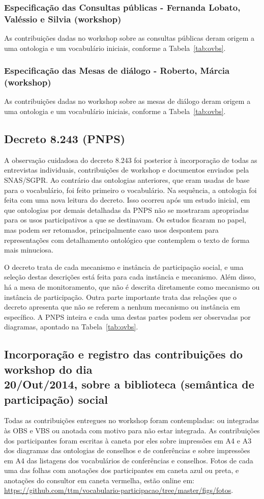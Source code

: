 \documentclass[12pt]{article}
\begin{document}
\subsubsection{Especificação das Consultas públicas - Fernanda Lobato, Valéssio e Silvia (workshop)}
As contribuições dadas no workshop sobre as consultas públicas deram origem a uma ontologia e um vocabulário iniciais, conforme a Tabela~\ref{tab:ovbs}.

\subsubsection{Especificação das Mesas de diálogo - Roberto, Márcia (workshop)}
As contribuições dadas no workshop sobre as mesas de diálogo deram origem a uma ontologia e um vocabulário iniciais, conforme a Tabela~\ref{tab:ovbs}.


\subsection{Decreto 8.243 (PNPS)}\label{ap:pnps}
A observação cuidadosa do decreto 8.243 foi posterior à incorporação de todas as entrevistas individuais, contribuições de workshop e documentos enviados pela SNAS/SGPR. Ao contrário das ontologias anteriores, que eram usadas de base para o vocabulário, foi feito primeiro o vocabulário. Na sequência, a ontologia foi feita com uma nova leitura do decreto. Isso ocorreu após um estudo inicial, em que ontologias por demais detalhadas da PNPS não se mostraram apropriadas para os usos participativos a que se destinavam. Os estudos ficaram no papel, mas podem ser retomados, principalmente caso usos despontem para representações com detalhamento ontológico que contemplem o texto de forma mais minuciosa.

O decreto trata de cada mecanismo e instância de participação social, e uma seleção destas descrições está feita para cada instância e mecanismo. Além disso, há a mesa de monitoramento, que não é descrita diretamente como mecanismo ou instância de participação. Outra parte importante trata das relações que o decreto apresenta que não se referem a nenhum mecanismo ou instância em específico. A PNPS inteira e cada uma destas partes podem ser observadas por diagramas, apontado na Tabela~\ref{tab:ovbs}.

\subsection{Incorporação e registro das contribuições do workshop do dia \\20/Out/2014, sobre a biblioteca (semântica de participação) social}
Todas as contribuições entregues no workshop foram contempladas: ou integradas às OBS e VBS ou anotada com motivo para não estar integrada. As contribuições dos participantes foram escritas à caneta por eles sobre impressões em A4 e A3 dos diagramas das ontologias de conselhos e de conferências e sobre impressões em A4 das listagens dos vocabulários de conferências e conselhos. Fotos de cada uma das folhas com anotações dos participantes em caneta azul ou preta, e anotações do consultor em caneta vermelha, estão online em: \url{https://github.com/ttm/vocabulario-participacao/tree/master/figs/fotos}.
\end{document}
